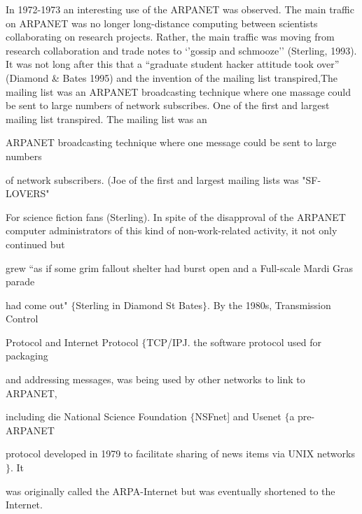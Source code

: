 \documentclass{book} %
\begin{document}
\begin{flushleft}
\noindent      In 1972-1973 an interesting use of the ARPANET was observed. The main traffic on ARPANET was no longer long-distance computing between scientists collaborating on research projects. Rather, the main traffic was moving from research collaboration and trade notes to `'gossip and schmooze'' (Sterling, 1993). It was not long after this that a ``graduate student hacker attitude took over'' (Diamond \& Bates 1995) and the invention of the mailing list transpired,The mailing list was an ARPANET broadcasting technique where one massage could be sent to large numbers of network subscribes. One of the first and largest mailing list transpired. The mailing list was an

\noindent ARPANET broadcasting technique where one message could be sent to large numbers

\noindent of network subscribers. (Joe of the first and largest mailing lists was "SF-LOVERS"

\noindent For science fiction fans (Sterling). In spite of the disapproval of the ARPANET computer administrators of this kind of non-work-related activity, it not only continued but

\noindent grew ``as if some grim fallout shelter had burst open and a Full-scale Mardi Gras parade

\noindent had come out" $\mathrm{\{}$Sterling in Diamond St Bates$\mathrm{\}}$. By the 1980s, Transmission Control

\noindent Protocol and Internet Protocol $\mathrm{\{}$TCP/IPJ. the software protocol used for packaging

\noindent and addressing messages, was being used by other networks to link to ARPANET,

\noindent including die National Science Foundation $\mathrm{\{}$NSFnet] and Usenet $\mathrm{\{}$a pre-ARPANET

\noindent protocol developed in 1979 to facilitate sharing of news items via UNIX networks$\mathrm{\}}$. It

\noindent was originally called the ARPA-Internet but was eventually shortened to the Internet.
\end{flushleft}
\end{document}
